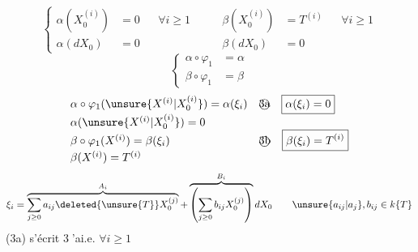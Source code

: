 \[
 \left\{\begin{aligned}
 \alpha(X_0^{(i)})&=0&&\forall i\geq1\\
 \alpha(dX_0)&=0
 \end{aligned}\right.
 \qquad
 \begin{aligned}
 \beta(X_0^{(i)})&=T^{(i)}&&\forall i\geq1\\
 \beta(dX_0)&=0
 \end{aligned}
\]
\[
 \left\{\begin{aligned}\alpha\circ\varphi_1&=\alpha\\\beta\circ\varphi_1&=\beta\end{aligned}\right.
\]
\[
 \begin{array}{ll}
 \alpha\circ\varphi_1(\unsure{X^{(i)}|X_0^{(i)}})=\alpha(\xi_i)&
 \text{\textcircled{3a}}\quad\boxed{\alpha(\xi_i)=0}\\
 \alpha(\unsure{X^{(i)}|X_0^{(i)}})=0&\\
 \beta\circ\varphi_1(X^{(i)})=\beta(\xi_i)&
 \text{\textcircled{3b}}\quad\boxed{\beta(\xi_i)=T^{(i)}}\\
 \beta(X^{(i)})=T^{(i)}&
 \end{array}
\]
\[
 \xi_i=\overbrace{\sum_{j\geq0}a_{ij}\deleted{\unsure{T}}X_0^{(j)}}^{A_i}
 +\overbrace{\left(\sum_{j\geq0}b_{ij}X_0^{(j)}\right)}^{B_i}dX_0
 \qquad \unsure{a_{ij}|a_j},b_{ij}\in k\{T\}
\]
(3a) s'écrit
\textcircled{3'a}\quad i.e.
$\forall i\geq1$

